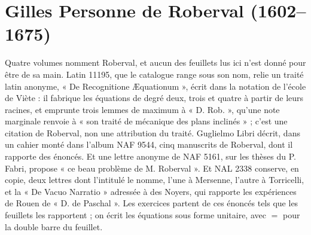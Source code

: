 \documentclass[11pt,a4paper]{article}
\begin{document}
\section*{Gilles Personne de Roberval (1602--1675)}

Quatre volumes nomment Roberval, et aucun des feuillets lus ici n'est donné pour
être de sa main. Latin 11195, que le catalogue range sous son nom, relie un
traité latin anonyme, « De Recognitione Æquationum », écrit dans la notation de
l'école de Viète : il fabrique les équations de degré deux, trois et quatre à
partir de leurs racines, et emprunte trois lemmes de maximum à « D. Rob. »,
qu'une note marginale renvoie à « son traité de mécanique des plans inclinés » ;
c'est une citation de Roberval, non une attribution du traité. Guglielmo Libri
décrit, dans un cahier monté dans l'album NAF 9544, cinq manuscrits de Roberval,
dont il rapporte des énoncés. Et une lettre anonyme de NAF 5161, sur les thèses
du P. Fabri, propose « ce beau problème de M. Roberval ». Et NAL 2338 conserve,
en copie, deux lettres dont l'intitulé le nomme, l'une à Mersenne, l'autre à
Torricelli, et la « De Vacuo Narratio » adressée à des Noyers, qui rapporte les
expériences de Rouen de « D. de Paschal ». Les exercices partent de
ces énoncés tels que les feuillets les rapportent ; on écrit les équations sous
forme unitaire, avec $=$ pour la double barre du feuillet.
\end{document}
